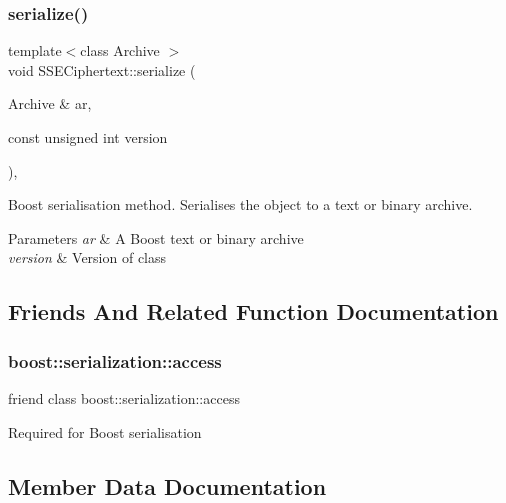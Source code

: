 \subsubsection{\texorpdfstring{serialize()}{serialize()}}
{\footnotesize\ttfamily template$<$class Archive $>$ \\
void S\+S\+E\+Ciphertext\+::serialize (\begin{DoxyParamCaption}\item[{Archive \&}]{ar,  }\item[{const unsigned int}]{version }\end{DoxyParamCaption})\hspace{0.3cm}{\ttfamily [inline]}, {\ttfamily [private]}}

Boost serialisation method. Serialises the object to a text or binary archive. 
\begin{DoxyParams}{Parameters}
{\em ar} & A Boost text or binary archive \\
\hline
{\em version} & Version of class \\
\hline
\end{DoxyParams}


\subsection{Friends And Related Function Documentation}
\mbox{\label{classSSECiphertext_ac98d07dd8f7b70e16ccb9a01abf56b9c}} 
\subsubsection{\texorpdfstring{boost\+::serialization\+::access}{boost::serialization::access}}
{\footnotesize\ttfamily friend class boost\+::serialization\+::access\hspace{0.3cm}{\ttfamily [friend]}}

Required for Boost serialisation 

\subsection{Member Data Documentation}
\mbox{\label{classSSECiphertext_ab2c817fd8b33aef10acf723a00c19507}} 
